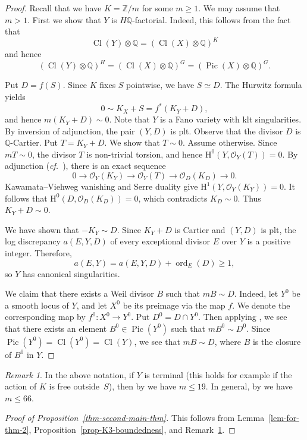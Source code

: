 \documentclass[10pt,a4paper]{article}
\theoremstyle{definition}
\theoremstyle{remark}
\newtheorem{remark}[thm]{Remark}
\newcommand{\OOO}{\mathscr{O}}
\newcommand{\lra}{\longrightarrow}
\DeclareMathOperator{\Cl}{Cl}
\DeclareMathOperator{\Pic}{Pic}
\begin{document}
\begin{proof}
Recall that we have $K=\mathbb{Z}/m$ for some $m\geq 1$. We may assume that $m>1$. 
First we show that $Y$ is $H\mathbb{Q}$-factorial. Indeed, this follows from the fact that
\[
\Cl(Y)\otimes\mathbb{Q} = (\Cl(X)\otimes\mathbb{Q})^{K}
\]
and hence 
\[
(\Cl(Y)\otimes\mathbb{Q})^{H} = (\Cl(X)\otimes\mathbb{Q})^{G} = (\Pic(X)\otimes\mathbb{Q})^{G}.
\]

Put $D=f(S)$. Since $K$ fixes $S$ pointwise, we have $S\simeq D$. The Hurwitz formula yields
\[
0\sim K_X + S = f^*( K_Y + D ),
\]
and hence $m(K_Y + D)\sim 0$. Note that $Y$ is a Fano variety with klt singularities. By inversion of adjunction, the pair $(Y,D)$ is plt. Observe that the divisor $D$ is $\mathbb{Q}$-Cartier.
Put $T=K_Y+D$. We show that $T\sim0$. Assume otherwise. Since $mT\sim0$, the divisor $T$ is non-trivial torsion, and hence $\mathrm H^0(Y,\OOO_Y(T))=0$. By adjunction (\textit{cf.}~\cite[Corollary~5.25]{KM98}), there is an exact sequence
\[
0\lra\OOO_Y(K_Y)\lra\OOO_Y(T)\lra\OOO_D(K_D)\lra0.
\]
Kawamata--Viehweg vanishing and Serre duality give $\mathrm H^1(Y,\OOO_Y(K_Y))=0$. It follows that $\mathrm H^0(D,\OOO_D(K_D))=0$, which contradicts $K_D\sim0$. Thus $K_Y+D\sim0$.

We have shown that $-K_Y\sim D$. Since $K_Y+D$ is Cartier and $(Y,D)$ is plt, the log discrepancy $a(E,Y,D)$ of every exceptional divisor $E$ over $Y$ is a positive integer. Therefore,
\[
a(E,Y)=a(E,Y,D)+\operatorname{ord}_E(D)\geq1,
\]
so $Y$ has canonical singularities.
 
We claim that there exists a Weil divisor $B$ such that $mB\sim D$. Indeed, let $Y^0$ be a smooth locus of $Y$, and let $X^0$ be its preimage via the map $f$. We denote the corresponding map by $f^0\colon X^0\to Y^0$. Put $D^0=D\cap Y^0$. Then applying \cite[Theorem 1.2]{Wa68}, we see that there exists an element $B^0\in\Pic(Y^0)$ such that $mB^0\sim D^0$. Since $\Pic(Y^0)=\Cl(Y^0)=\Cl(Y)$, we see that $mB\sim D$, where $B$ is the closure of $B^0$ in $Y$. 
\end{proof}

\begin{remark}
\label{rem-bounded-index}
In the above notation, if $Y$ is terminal (this holds for example if the action of $K$ is free outside~$S$), then by \cite{Su04} we have $m\leq 19$. In general, by \cite{JL25} we have $m\leq 66$. 
\end{remark}

\begin{proof}[Proof of Proposition~\ref{thm-second-main-thm}]
This follows from Lemma~\ref{lem-for-thm-2}, Proposition~\ref{prop-K3-boundedness}, and Remark~\ref{rem-bounded-index}.
 \end{proof}
\end{document}
